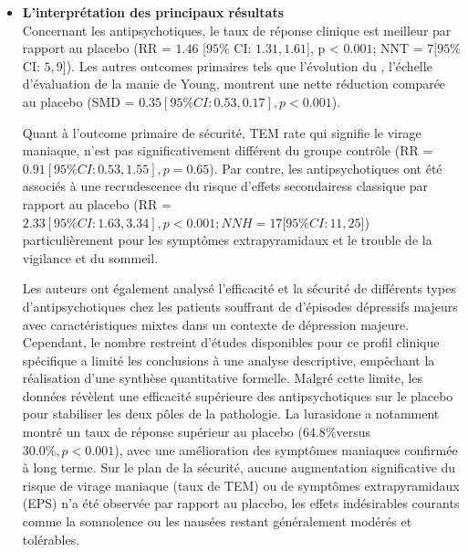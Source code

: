 \begin{itemize}[label=\textbullet]
    Les méthodes utilisées pour interpréter les résultats de cette méta-analyse semblent répondre à l’EBM. Toutefois, le talon d’Achille de cette étude est le nombre d’études disponibles et leur qualité intrinsèque, en effet la majorité des articles étaient des analyses post-hoc, c’est-à-dire, des analyses qui n’avaient pas pour objet la thématique de cette méta-analyse mais dont les données ont été recueillies. Les auteurs qualifient donc cette méta-analyse de préliminaire, nécessitant par la suite des RCT prospectifs. De plus, les variations de définition de dépression avec caractéristiques mixtes sont retrouvées dans la littérature médicale ce qui complique la réalisation de la méta-analyse et peut-être biaise la sélection des patients. 
    
    \item \textbf{L'interprétation des principaux résultats}\\
    Concernant les antipsychotiques, le taux de réponse clinique est meilleur par rapport au placebo  (RR = $1.46$ [$95$\% CI: $1.31, 1.61$], p < $0.001$; NNT = $7 [95$\% CI: $5, 9$]).  Les autres outcomes primaires tels que l’évolution du , l’échelle d’évaluation de la manie de Young, montrent une nette réduction comparée au placebo (SMD = $0.35 [95\% CI: 0.53, 0.17], p < 0.001$). 
    
    Quant à l’outcome primaire de sécurité, TEM rate qui signifie le virage maniaque, n’est pas significativement différent du groupe contrôle (RR = $0.91 [95\% CI: 0.53, 1.55], p = 0.65$). Par contre, les antipsychotiques ont été associés à une recrudescence du risque d’effets secondairess classique par rapport au placebo (RR = $2.33 [95\% CI: 1.63,3.34], p < 0.001; NNH = 17 [95\% CI: 11,25$]) particulièrement pour les symptômes extrapyramidaux et le trouble de la vigilance et du sommeil.
    
    Les auteurs ont également analysé l’efficacité et la sécurité de différents types d’antipsychotiques chez les patients souffrant de d’épisodes dépressifs majeurs avec caractéristiques mixtes dans un contexte de dépression majeure. Cependant, le nombre restreint d'études disponibles pour ce profil clinique spécifique a limité les conclusions à une analyse descriptive, empêchant la réalisation d'une synthèse quantitative formelle. Malgré cette limite, les données révèlent une efficacité supérieure des antipsychotiques sur le placebo pour stabiliser les deux pôles de la pathologie. La lurasidone a notamment montré un taux de réponse supérieur au placebo ($64.8\% $versus $30.0\%, p < 0.001$), avec une amélioration des symptômes maniaques confirmée à long terme.  Sur le plan de la sécurité, aucune augmentation significative du risque de virage maniaque (taux de TEM) ou de symptômes extrapyramidaux (EPS) n'a été observée par rapport au placebo, les effets indésirables courants comme la somnolence ou les nausées restant généralement modérés et tolérables.
    

\end{itemize}
